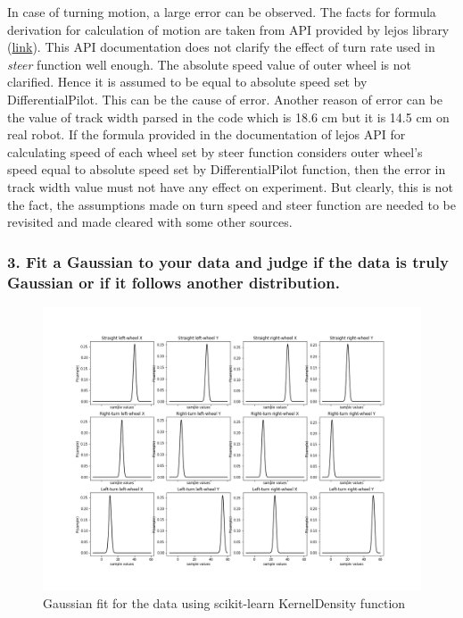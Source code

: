 \documentclass[11pt,a4paper,openright,twoside]{extreport}
\begin{document}
In case of turning motion, a large error can be observed. The facts for formula derivation for calculation of motion are taken from API provided by lejos library (\href{http://www.lejos.org/nxt/nxj/api/lejos/robotics/navigation/DifferentialPilot.html#steer(double)}{link}). This API documentation does not clarify the effect of turn rate used in \textit{steer} function well enough. The absolute speed value of outer wheel is not clarified. Hence it is assumed to be equal to absolute speed set by DifferentialPilot. This can be the cause of error.
Another reason of error can be the value of track width parsed in the code which is 18.6 cm but it is 14.5 cm on real robot.
If the formula provided in the documentation of lejos API for calculating speed of each wheel set by steer function considers outer wheel's speed equal to absolute speed set by DifferentialPilot function, then the error in track width value must not have any effect on experiment. But clearly, this is not the fact, the assumptions made on turn speed and steer function are needed to be revisited and made cleared with some other sources.      




\subsubsection*{3. Fit a Gaussian to your data and judge if the data is truly Gaussian or if it follows another distribution.}

\begin{figure}[ht]
\centering
\includegraphics[width=\textwidth]{gaussian_fits.png}
\caption{Gaussian fit for the data using scikit-learn KernelDensity function}
\label{gaussian}
\end{figure}
\end{document}

